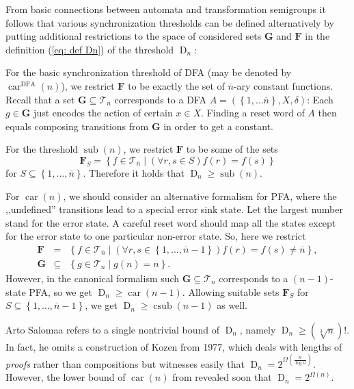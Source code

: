 \documentclass{ws-ijmpc}
\DeclareMathOperator{\D}{D}
\DeclareMathOperator{\car}{car}
\DeclareMathOperator{\sub}{sub}
\DeclareMathOperator{\csub}{csub}
\begin{document}
From basic connections between automata and transformation semigroups
it follows that various synchronization thresholds can be defined
alternatively by putting additional restrictions to the space of considered
sets $\mathbf{G}$ and $\mathbf{F}$ in the definition (\ref{eq: def Dn})
of the threshold $\D_{n}$:
\begin{romanlist}
\item For the basic synchronization threshold of DFA (may be denoted by
$\car^{\mathrm{DFA}}\!\left(n\right)$), we restrict $\mathbf{F}$
to be exactly the set of $\overline{n}$-ary constant functions. Recall
that a set $\mathbf{G}\subseteq\mathcal{T}_{\overline{n}}$ corresponds
to a DFA $A=\left(\left\{ 1,\dots\overline{n}\right\} ,X,\delta\right)$:
Each $g\in\mathbf{G}$ just encodes the action of certain $x\in X$.
Finding a reset word of $A$ then equals composing transitions from
$\mathbf{G}$ in order to get a constant.
\item For the threshold $\sub\!\left(n\right)$, we restrict $\mathbf{F}$
to be some of the sets 
\[
\mathbf{F}_{S}=\left\{ f\in\mathcal{T}_{\overline{n}}\mid\left(\forall r,s\in S\right)f\left(r\right)=f\left(s\right)\right\} 
\]
 for $S\subseteq\left\{ 1,\dots,\overline{n}\right\} $. Therefore
it holds that $\D_{n}\geq\sub\!\left(n\right).$
\item For $\car\!\left(n\right)$, we should consider an alternative formalism
for PFA, where the ,,undefined'' transitions lead to a special error
sink state. Let the largest number stand for the error state. A careful
reset word should map all the states except for the error state to
one particular non-error state. So, here we restrict 
\begin{eqnarray*}
\mathbf{F} & = & \left\{ f\in\mathcal{T}_{\overline{n}}\mid\left(\forall r,s\in\left\{ 1,\dots,\overline{n}-1\right\} \right)f\left(r\right)=f\left(s\right)\neq\overline{n}\right\} ,\\
\mathbf{G} & \subseteq & \left\{ g\in\mathcal{T}_{n}\mid g\!\left(n\right)=n\right\} .
\end{eqnarray*}
However, in the canonical formalism such $\mathbf{G}\subseteq\mathcal{T}_{n}$
corresponds to a $\left(n-1\right)$-state PFA, so we get $\D_{n}\geq\car\!\left(n-1\right).$
Allowing suitable sets $\mathbf{F}_{S}$ for $S\subseteq\left\{ 1,\dots,\overline{n}-1\right\} $,
we get $\D_{n}\geq\csub\!\left(n-1\right)$ as well.
\end{romanlist}
Arto Salomaa refers to a single nontrivial bound of $\D_{n}$, namely
$\D_{n}\geq\left(\sqrt[3]{n}\right)!$. In fact, he omits a construction
of Kozen \citep[Theorem 3.2.7]{KOZ1} from 1977, which deals with
lengths of \emph{proofs} rather than compositions but witnesses easily
that $\D_{n}=2^{\Omega\left(\frac{n}{\log n}\right)}$.\textbf{ }However,
the lower bound of $\car\!\left(n\right)$ from \citep{ITO1short}
revealed soon that\textbf{ $\D_{n}=2^{\Omega\left(n\right)}$}.\textbf{ }
\end{document}
